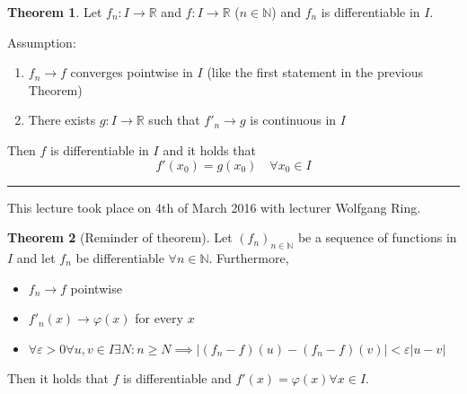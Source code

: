 \documentclass[a4paper,landscape,twocolumn]{article}
\theoremstyle{definition}
\newtheorem{theorem}{Theorem}
\newcommand\abs[1]{\left|#1\right|}
\newcommand\meta[3]{\hrule{} This #1 took place on #2 with lecturer #3.\par}
\begin{document}
\begin{theorem}
  Let $f_n: I \to \mathbb R$ and $f: I \to \mathbb R$ ($n \in \mathbb N$)
  and $f_n$ is differentiable in $I$.

  Assumption:
  \begin{enumerate}
    \item $f_n \to f$ converges pointwise in $I$
      (like the first statement in the previous Theorem)
    \item There exists $g: I \to \mathbb R$ such that
      $f'_n \to g$ is continuous in $I$
  \end{enumerate}
  Then $f$ is differentiable in $I$ and it holds that
  \[ f'(x_0) = g(x_0) \quad \forall x_0 \in I \]
\end{theorem}

\meta{lecture}{4th of March 2016}{Wolfgang Ring}

\begin{theorem}[Reminder of theorem]
  \label{thm:diff-conv}
  Let $(f_n)_{n\in\mathbb N}$ be a sequence of functions in $I$ and
  let $f_n$ be differentiable $\forall n \in \mathbb N$. Furthermore,
  \begin{itemize}
    \item $f_n \to f$ pointwise
    \item $f'_n(x) \to \varphi(x)$ for every $x$
    \item $\forall \varepsilon > 0 \forall u,v \in I \exists N: n \geq N
      \implies \abs{(f_n - f)(u) - (f_n - f)(v)} < \varepsilon \abs{u - v}$
  \end{itemize}
  Then it holds that $f$ is differentiable and $f'(x) = \varphi(x) \forall x \in I$.
\end{theorem}
\end{document}
